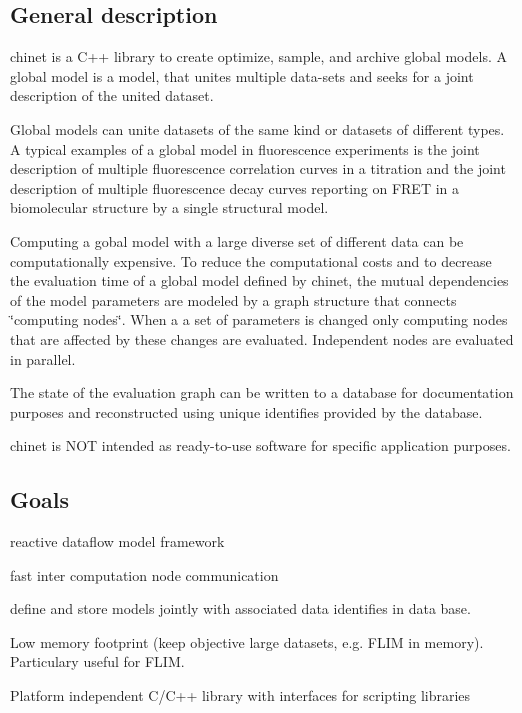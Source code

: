 \href{https://travis-ci.org/tpeulen/chinet}{\tt } \href{https://www.codacy.com?utm_source=github.com&amp;utm_medium=referral&amp;utm_content=tpeulen/chinet&amp;utm_campaign=Badge_Grade}{\tt } \href{https://conda.anaconda.org/tpeulen}{\tt } \href{https://anaconda.org/tpeulen/chinet}{\tt } \href{https://anaconda.org/tpeulen/chinet}{\tt }

\subsection*{General description}

chinet is a C++ library to create optimize, sample, and archive global models. A global model is a model, that unites multiple data-\/sets and seeks for a joint description of the united dataset.

Global models can unite datasets of the same kind or datasets of different types. A typical examples of a global model in fluorescence experiments is the joint description of multiple fluorescence correlation curves in a titration and the joint description of multiple fluorescence decay curves reporting on F\+R\+ET in a biomolecular structure by a single structural model.

Computing a gobal model with a large diverse set of different data can be computationally expensive. To reduce the computational costs and to decrease the evaluation time of a global model defined by chinet, the mutual dependencies of the model parameters are modeled by a graph structure that connects \char`\"{}computing nodes\char`\"{}. When a a set of parameters is changed only computing nodes that are affected by these changes are evaluated. Independent nodes are evaluated in parallel.

The state of the evaluation graph can be written to a database for documentation purposes and reconstructed using unique identifies provided by the database.

chinet is N\+OT intended as ready-\/to-\/use software for specific application purposes.

\subsection*{Goals}


\begin{DoxyItemize}
\item reactive dataflow model framework
\item fast inter computation node communication
\item define and store models jointly with associated data identifies in data base.
\item Low memory footprint (keep objective large datasets, e.\+g. F\+L\+IM in memory). Particulary useful for F\+L\+IM.
\item Platform independent C/\+C++ library with interfaces for scripting libraries
\end{DoxyItemize}

